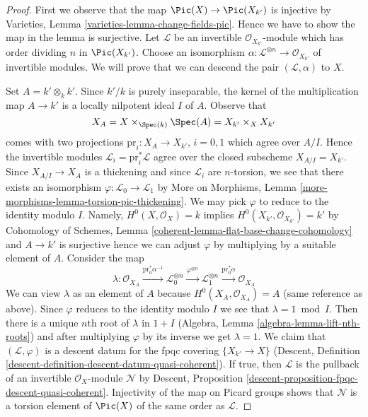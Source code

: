 \begin{proof}
First we observe that the map $\Pic(X) \to \Pic(X_{k'})$
is injective by Varieties, Lemma \ref{varieties-lemma-change-fields-pic}.
Hence we have to show the map in the lemma is surjective.
Let $\mathcal{L}$ be an invertible $\mathcal{O}_{X_{k'}}$-module
which has order dividing $n$ in $\Pic(X_{k'})$.
Choose an isomorphism
$\alpha : \mathcal{L}^{\otimes n} \to \mathcal{O}_{X_{k'}}$
of invertible modules.
We will prove that we can descend the pair $(\mathcal{L}, \alpha)$
to $X$.

\medskip\noindent
Set $A = k' \otimes_k k'$. Since $k'/k$ is purely inseparable,
the kernel of the multiplication map $A \to k'$ is a
locally nilpotent ideal $I$ of $A$. Observe that
$$
X_A = X \times_{\Spec(k)} \Spec(A) = X_{k'} \times_X X_{k'}
$$
comes with two projections $\text{pr}_i : X_A \to X_{k'}$, $i = 0, 1$
which agree over $A/I$. Hence the invertible modules
$\mathcal{L}_i = \text{pr}_i^*\mathcal{L}$
agree over the closed subscheme $X_{A/I} = X_{k'}$.
Since $X_{A/I} \to X_A$ is a thickening and since
$\mathcal{L}_i$ are $n$-torsion, we see that there
exists an isomorphism $\varphi : \mathcal{L}_0 \to \mathcal{L}_1$ by
More on Morphisms, Lemma \ref{more-morphisms-lemma-torsion-pic-thickening}.
We may pick $\varphi$ to reduce to the identity modulo $I$. Namely,
$H^0(X, \mathcal{O}_X) = k$ implies
$H^0(X_{k'}, \mathcal{O}_{X_{k'}}) = k'$ by
Cohomology of Schemes, Lemma \ref{coherent-lemma-flat-base-change-cohomology}
and $A \to k'$ is surjective hence we can adjust $\varphi$ by multiplying by
a suitable element of $A$. Consider the map
$$
\lambda : \mathcal{O}_{X_A}
\xrightarrow{\text{pr}_0^*\alpha^{-1}}
\mathcal{L}_0^{\otimes n}
\xrightarrow{\varphi^{\otimes n}}
\mathcal{L}_1^{\otimes n}
\xrightarrow{\text{pr}_0^*\alpha}
\mathcal{O}_{X_A}
$$
We can view $\lambda$ as an element of $A$ because
$H^0(X_A, \mathcal{O}_{X_A}) = A$ (same reference as above).
Since $\varphi$ reduces to the identity modulo $I$ we
see that $\lambda = 1 \bmod I$. Then there is a unique
$n$th root of $\lambda$ in $1 + I$
(Algebra, Lemma \ref{algebra-lemma-lift-nth-roots})
and after multiplying $\varphi$ by its inverse we get $\lambda = 1$.
We claim that $(\mathcal{L}, \varphi)$ is a descent datum
for the fpqc covering $\{X_{k'} \to X\}$
(Descent, Definition \ref{descent-definition-descent-datum-quasi-coherent}).
If true, then $\mathcal{L}$ is the pullback of an invertible
$\mathcal{O}_X$-module $\mathcal{N}$ by
Descent, Proposition \ref{descent-proposition-fpqc-descent-quasi-coherent}.
Injectivity of the map on Picard groups shows that $\mathcal{N}$
is a torsion element of $\Pic(X)$ of the same order as $\mathcal{L}$.


\end{proof}
